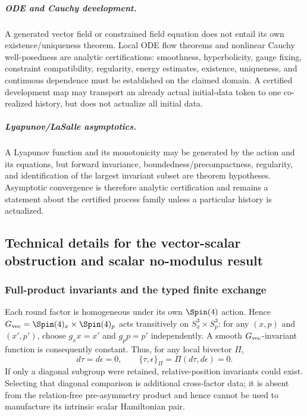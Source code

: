 \documentclass[11pt,a4paper]{article}
\begin{document}
\subparagraph{ODE and Cauchy development.}
A generated vector field or constrained field equation does not entail its
own existence/uniqueness theorem.  Local ODE flow theorems and nonlinear
Cauchy well-posedness are analytic certifications: smoothness, hyperbolicity,
gauge fixing, constraint compatibility, regularity, energy estimates,
existence, uniqueness, and continuous dependence must be established on the
claimed domain.  A certified development map may transport an already actual
initial-data token to one co-realized history, but does not actualize all
initial data.

\subparagraph{Lyapunov/LaSalle asymptotics.}
A Lyapunov function and its monotonicity may be generated by the action and
its equations, but forward invariance, boundedness/precompactness, regularity,
and identification of the largest invariant subset are theorem hypotheses.
Asymptotic convergence is therefore analytic certification and remains a
statement about the certified process family unless a particular history is
actualized.

\subsection{Technical details for the vector-scalar obstruction and scalar no-modulus result}

\subsubsection{Full-product invariants and the typed finite exchange}
\label{p3a:app:vector-scalar-obstruction-details}
Each round factor is homogeneous under its own \(\Spin(4)\) action.  Hence
\(G_{\rm vec}=\Spin(4)_x\times\Spin(4)_p\) acts transitively on
\(S_x^3\times S_p^3\): for any \((x,p)\) and \((x',p')\), choose
\(g_xx=x'\) and \(g_pp=p'\) independently.  A smooth
\(G_{\rm vec}\)-invariant function is consequently constant.  Thus, for any
local bivector \(\Pi\),
\[
 d\tau=d\epsilon=0,
 \qquad
 \{\tau,\epsilon\}_\Pi=\Pi(d\tau,d\epsilon)=0.
\]
If only a diagonal subgroup were retained, relative-position invariants could
exist.  Selecting that diagonal comparison is additional cross-factor data;
it is absent from the relation-free pre-asymmetry product and hence cannot be
used to manufacture its intrinsic scalar Hamiltonian pair.
\end{document}
